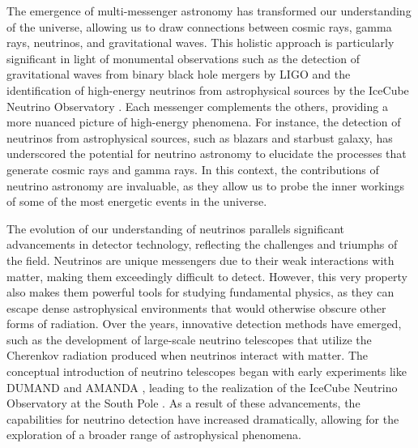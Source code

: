 The emergence of multi-messenger astronomy has transformed our understanding of the universe, allowing us to draw connections between cosmic rays, gamma rays, neutrinos, and gravitational waves. This holistic approach is particularly significant in light of monumental observations such as the detection of gravitational waves from binary black hole mergers by LIGO  and the identification of high-energy neutrinos from astrophysical sources by the IceCube Neutrino Observatory . Each messenger complements the others, providing a more nuanced picture of high-energy phenomena. For instance, the detection of neutrinos from astrophysical sources, such as blazars and starbust galaxy, has underscored the potential for neutrino astronomy to elucidate the processes that generate cosmic rays and gamma rays. In this context, the contributions of neutrino astronomy are invaluable, as they allow us to probe the inner workings of some of the most energetic events in the universe.

The evolution of our understanding of neutrinos parallels significant advancements in detector technology, reflecting the challenges and triumphs of the field. Neutrinos are unique messengers due to their weak interactions with matter, making them exceedingly difficult to detect. However, this very property also makes them powerful tools for studying fundamental physics, as they can escape dense astrophysical environments that would otherwise obscure other forms of radiation. Over the years, innovative detection methods have emerged, such as the development of large-scale neutrino telescopes that utilize the Cherenkov radiation produced when neutrinos interact with matter. The conceptual introduction of neutrino telescopes began with early experiments like DUMAND  and AMANDA , leading to the realization of the IceCube Neutrino Observatory at the South Pole . As a result of these advancements, the capabilities for neutrino detection have increased dramatically, allowing for the exploration of a broader range of astrophysical phenomena.

